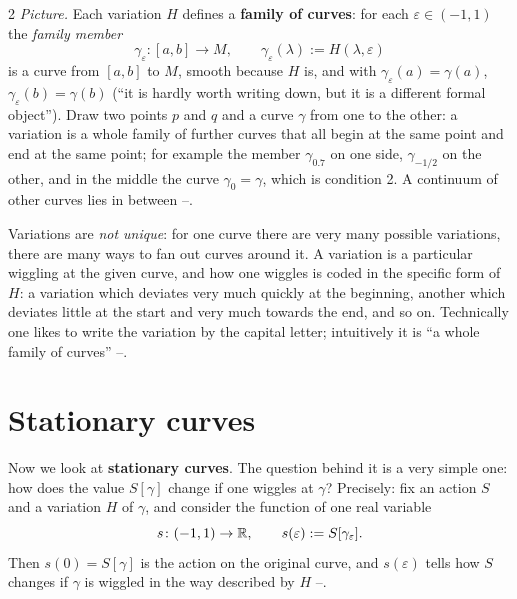 \begin{paracol}{2}
\emph{Picture.} Each variation $H$ defines a \textbf{family of curves}: for each $\varepsilon\in(-1,1)$ the \emph{family member}
\begin{equation}\label{eq:var-member}
  \gamma_\varepsilon\colon[a,b]\to M,\qquad\gamma_\varepsilon(\lambda):=H(\lambda,\varepsilon)
\end{equation}
is a curve from $[a,b]$ to $M$, smooth because $H$ is, and with $\gamma_\varepsilon(a)=\gamma(a)$, $\gamma_\varepsilon(b)=\gamma(b)$ (``it is hardly worth writing down, but it is a different formal object''). Draw two points $p$ and $q$ and a curve $\gamma$ from one to the other: a variation is a whole family of further curves that all begin at the same point and end at the same point; for example the member $\gamma_{0.7}$ on one side, $\gamma_{-1/2}$ on the other, and in the middle the curve $\gamma_0=\gamma$, which is condition 2. A continuum of other curves lies in between --.

Variations are \emph{not unique}: for one curve there are very many possible variations, there are many ways to fan out curves around it. A variation is a particular wiggling at the given curve, and how one wiggles is coded in the specific form of $H$: a variation which deviates very much quickly at the beginning, another which deviates little at the start and very much towards the end, and so on. Technically one likes to write the variation by the capital letter; intuitively it is ``a whole family of curves'' --.

\section{Stationary curves}\label{sec:var-stationary}

Now we look at \textbf{stationary curves}. The question behind it is a very simple one: how does the value $S[\gamma]$ change if one wiggles at $\gamma$? Precisely: fix an action $S$ and a variation $H$ of $\gamma$, and consider the function of one real variable
\begin{equation}\label{eq:var-s}
  s\colon(-1,1)\to\mathbb{R},\qquad s(\varepsilon):=S[\gamma_\varepsilon].
\end{equation}
Then $s(0)=S[\gamma]$ is the action on the original curve, and $s(\varepsilon)$ tells how $S$ changes if $\gamma$ is wiggled in the way described by $H$ --.


\end{paracol}
